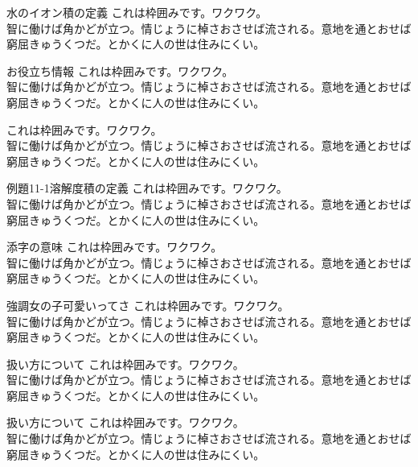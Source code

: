\documentclass[book, twoside, paper=b5j, fleqn, jafontsize=9pt, jafontscale=1, head_space=22mm, foot_space=9mm, fore-edge=16mm, gutter=25mm, hanging_punctuation]{jlreq}
\newenvironment{framebox-ref}[1]{\begin{ascolorbox5}[\gothic{#1}]{参~考}}{\end{ascolorbox5}}
\newenvironment{framebox-note}[1]{\begin{ascolorbox19}[\gothic{#1}]{補足}}{\end{ascolorbox19}}
\newenvironment{framebox-simple}[1]{\begin{simplesquarebox}{\gothic{#1}}}{\end{simplesquarebox}}
\newenvironment{framebox-key}{\begin{simplesquarebox}{\gothic{KEY}}}{\end{simplesquarebox}}
\newenvironment{framebox-simplen}[2]{\begin{simplesquarebox}[\gothic{#2}]{\gothic{#1}}}{\end{simplesquarebox}}
\newenvironment{framebox-ex}[2]{\begin{ascolorbox4}[\gothic{#2}]{\gothic{#1}}}{\end{ascolorbox4}}
\newenvironment{framebox-warning}[1]{\begin{ascolorbox13}[\gothic{#1}]{\gothic{注意}}}{\end{ascolorbox13}}
\newenvironment{framebox-practice}[1]{\begin{practicebox}{\gothic{#1}}}{\end{practicebox}}
\begin{document}
\newpage
\begin{framebox-simple}{水のイオン積の定義}
これは枠囲みです。ワクワク。\\
智に働けば角かどが立つ。情じょうに棹さおさせば流される。意地を通とおせば窮屈きゅうくつだ。とかくに人の世は住みにくい。
\end{framebox-simple}

\begin{framebox-ref}{お役立ち情報}
これは枠囲みです。ワクワク。\\
智に働けば角かどが立つ。情じょうに棹さおさせば流される。意地を通とおせば窮屈きゅうくつだ。とかくに人の世は住みにくい。
\end{framebox-ref}

\begin{framebox-key}
これは枠囲みです。ワクワク。\\
智に働けば角かどが立つ。情じょうに棹さおさせば流される。意地を通とおせば窮屈きゅうくつだ。とかくに人の世は住みにくい。
\end{framebox-key}

\begin{framebox-simplen}{例題11-1}{溶解度積の定義}
これは枠囲みです。ワクワク。\\
智に働けば角かどが立つ。情じょうに棹さおさせば流される。意地を通とおせば窮屈きゅうくつだ。とかくに人の世は住みにくい。
\end{framebox-simplen}

\begin{framebox-note}{添字の意味}
これは枠囲みです。ワクワク。\\
智に働けば角かどが立つ。情じょうに棹さおさせば流される。意地を通とおせば窮屈きゅうくつだ。とかくに人の世は住みにくい。
\end{framebox-note}

\begin{framebox-ex}{強調}{女の子可愛いってさ}
これは枠囲みです。ワクワク。\\
智に働けば角かどが立つ。情じょうに棹さおさせば流される。意地を通とおせば窮屈きゅうくつだ。とかくに人の世は住みにくい。
\end{framebox-ex}

\begin{framebox-warning}{扱い方について}
これは枠囲みです。ワクワク。\\
智に働けば角かどが立つ。情じょうに棹さおさせば流される。意地を通とおせば窮屈きゅうくつだ。とかくに人の世は住みにくい。
\end{framebox-warning}
\extendpage
\begin{framebox-practice}{扱い方について}
    これは枠囲みです。ワクワク。\\
    智に働けば角かどが立つ。情じょうに棹さおさせば流される。意地を通とおせば窮屈きゅうくつだ。とかくに人の世は住みにくい。
    \end{framebox-practice}
\end{document}
